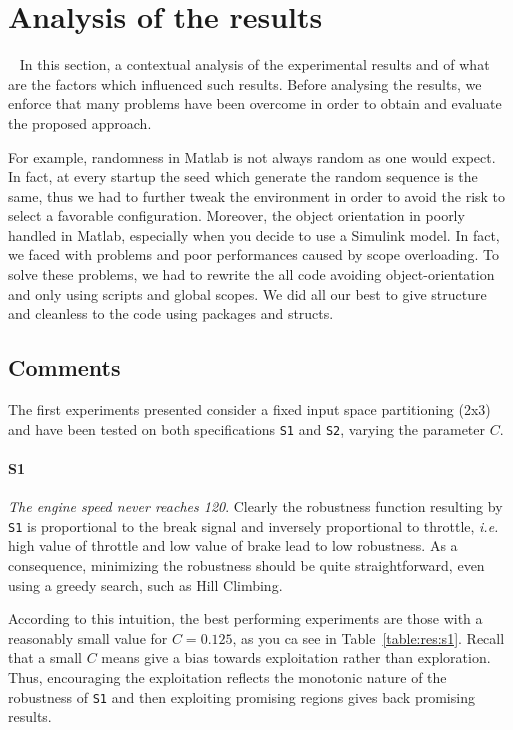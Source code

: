 \documentclass[11pt]{article}
\begin{document}
\pagebreak

\section{Analysis of the results}~\label{sec:resan}
In this section, a contextual analysis of the experimental results and of what are the factors which influenced such results.
Before analysing the results, we enforce that many problems have been overcome in order to obtain and evaluate the proposed approach. 

For example, randomness in Matlab is not always random as one would expect. In fact, at every startup the seed which generate the random sequence is the same, thus we had to further tweak the environment in order to avoid the risk to select a favorable configuration. Moreover, the object orientation in poorly handled in Matlab, especially when you decide to use a Simulink model. In fact, we faced with problems and poor performances caused by scope overloading. To solve these
problems, we had to rewrite the all code avoiding object-orientation and only using scripts and global scopes. We did all our best to give structure and cleanless to the code using packages and structs. 

\subsection{Comments}
The first experiments presented consider a fixed input space partitioning (2x3) and have been tested on both specifications \texttt{S1} and \texttt{S2}, varying the parameter $C$.

\paragraph{S1} \textit{The engine speed never reaches 120}. Clearly the robustness function resulting by \texttt{S1} is proportional to the break signal and inversely proportional to throttle, \textit{i.e.} high value of throttle and low value of brake lead to low robustness.
As a consequence, minimizing the robustness should be quite straightforward, even using a greedy search, such as Hill Climbing.

According to this intuition, the best performing experiments are those with a reasonably small value for $C=0.125$, as you ca see in Table~\ref{table:res:s1}.
Recall that a small $C$ means give a bias towards exploitation rather than exploration. Thus, encouraging the exploitation reflects the monotonic nature of the robustness of \texttt{S1} and then exploiting promising regions gives back promising results.
\end{document}
